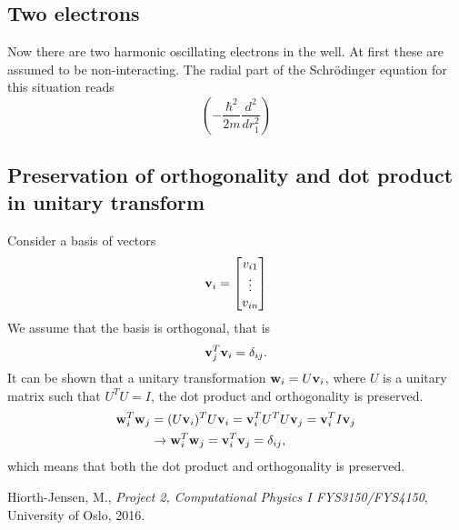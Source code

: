 \documentclass[10pt, a4paper]{amsart}
\begin{document}
\subsection{Two electrons}
Now  there are two harmonic oscillating electrons in the well. At first these are assumed to be non-interacting. The radial part of the Schrödinger equation for this situation reads
\begin{equation}
\left(-\frac{\hbar^2}{2m}\frac{d^2}{dr_1^2} \right)
\end{equation}

\subsection{Preservation of orthogonality and dot product in unitary transform}

Consider a basis of vectors 
\begin{equation}
\vb{v}_i = \begin{bmatrix}
v_{i1} \\
\vdots \\
v_{in}
\end{bmatrix}
\end{equation}
We assume that the basis is orthogonal, that is
\begin{equation}
\vb{v}_j^T\vb{v}_i=\delta_{ij}.
\end{equation}
It can be shown that a unitary transformation $\vb{w}_i = U\vb{v}_i$, where $U$ is a unitary matrix such that $U^TU=I$, the dot product and orthogonality is preserved. 
\begin{align}
\vb{w}_i^T\vb{w}_j &= (U\vb{v}_i)^T  U\vb{v}_i= \vb{v}_i^TU^T U\vb{v}_j = \vb{v}_i^T I \vb{v}_j \nonumber \\
&\rightarrow \vb{w}_i^T\vb{w}_j = \vb{v}_i^T\vb{v}_j = \delta_{ij},
\end{align}
which means that both the dot product and orthogonality is preserved.

\begin{thebibliography}{9}

	Hiorth-Jensen, M.,
	\emph{Project 2, Computational Physics I FYS3150/FYS4150},
	University of Oslo,
	2016.

\end{thebibliography}
\end{document}
